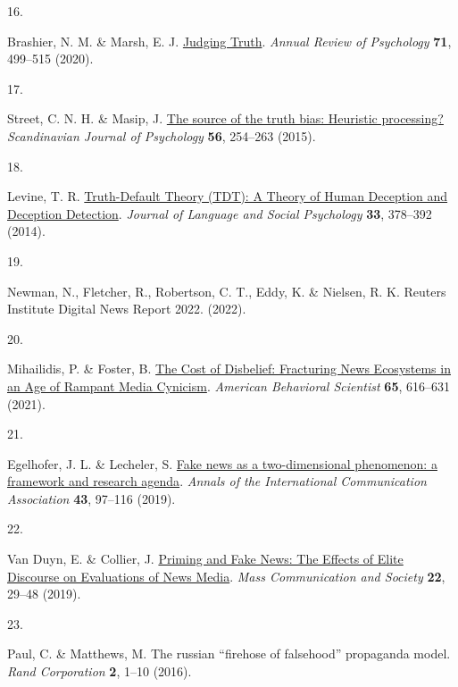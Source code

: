 \documentclass[
  man]{apa6}
\newlength{\cslhangindent}
\newlength{\csllabelwidth}
\newenvironment{CSLReferences}[2] %
 {\begin{list}{}{%
  \setlength{\itemindent}{0pt}
  \setlength{\leftmargin}{0pt}
  \setlength{\parsep}{0pt}
  \ifodd #1
   \setlength{\leftmargin}{\cslhangindent}
   \setlength{\itemindent}{-1\cslhangindent}
  \fi
  \setlength{\itemsep}{#2\baselineskip}}}
 {\end{list}}
\newcommand{\CSLLeftMargin}[1]{\parbox[t]{\csllabelwidth}{\strut#1\strut}}
\newcommand{\CSLRightInline}[1]{\parbox[t]{\linewidth - \csllabelwidth}{\strut#1\strut}}
\begin{document}
\begin{CSLReferences}{0}{0}
\CSLLeftMargin{16. }%
\CSLRightInline{Brashier, N. M. \& Marsh, E. J. \href{https://doi.org/10.1146/annurev-psych-010419-050807}{Judging Truth}. \emph{Annual Review of Psychology} \textbf{71}, 499--515 (2020).}

\CSLLeftMargin{17. }%
\CSLRightInline{Street, C. N. H. \& Masip, J. \href{https://doi.org/10.1111/sjop.12204}{The source of the truth bias: Heuristic processing?} \emph{Scandinavian Journal of Psychology} \textbf{56}, 254--263 (2015).}

\CSLLeftMargin{18. }%
\CSLRightInline{Levine, T. R. \href{https://doi.org/10.1177/0261927X14535916}{Truth-Default Theory (TDT): A Theory of Human Deception and Deception Detection}. \emph{Journal of Language and Social Psychology} \textbf{33}, 378--392 (2014).}

\CSLLeftMargin{19. }%
\CSLRightInline{Newman, N., Fletcher, R., Robertson, C. T., Eddy, K. \& Nielsen, R. K. Reuters Institute Digital News Report 2022. (2022).}

\CSLLeftMargin{20. }%
\CSLRightInline{Mihailidis, P. \& Foster, B. \href{https://doi.org/10.1177/0002764220978470}{The Cost of Disbelief: Fracturing News Ecosystems in an Age of Rampant Media Cynicism}. \emph{American Behavioral Scientist} \textbf{65}, 616--631 (2021).}

\CSLLeftMargin{21. }%
\CSLRightInline{Egelhofer, J. L. \& Lecheler, S. \href{https://doi.org/10.1080/23808985.2019.1602782}{Fake news as a two-dimensional phenomenon: a framework and research agenda}. \emph{Annals of the International Communication Association} \textbf{43}, 97--116 (2019).}

\CSLLeftMargin{22. }%
\CSLRightInline{Van Duyn, E. \& Collier, J. \href{https://doi.org/10.1080/15205436.2018.1511807}{Priming and Fake News: The Effects of Elite Discourse on Evaluations of News Media}. \emph{Mass Communication and Society} \textbf{22}, 29--48 (2019).}

\CSLLeftMargin{23. }%
\CSLRightInline{Paul, C. \& Matthews, M. The russian {``}firehose of falsehood{''} propaganda model. \emph{Rand Corporation} \textbf{2}, 1--10 (2016).}


\end{CSLReferences}
\end{document}
